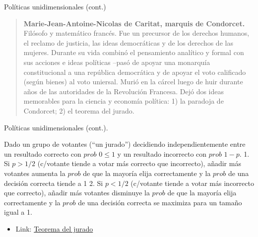 \documentclass[
  ignorenonframetext,
]{beamer}
\providecommand{\tightlist}{%
  \setlength{\itemsep}{0pt}\setlength{\parskip}{0pt}}\usepackage{longtable,booktabs,array}
\begin{document}
\begin{frame}
\begin{block}{Políticas unidimensionales (cont.)}
\protect\hypertarget{poluxedticas-unidimensionales-cont.}{}
\begin{quote}
\textbf{Marie-Jean-Antoine-Nicolas de Caritat, marquis de Condorcet.}
Filósofo y matemático francés. Fue un precursor de los derechos humanos,
el reclamo de justicia, las ideas democráticas y de los derechos de las
mujeres. Durante su vida combinó el pensamiento analítico y formal con
sus acciones e ideas políticas --pasó de apoyar una monarquía
constitucional a una república democrática y de apoyar el voto
calificado (según bienes) al voto uniersal. Murió en la cárcel luego de
huir durante años de las autoridades de la Revolución Francesa. Dejó dos
ideas memorables para la ciencia y economía política: 1) la paradoja de
Condorcet; 2) el teorema del jurado.
\end{quote}
\end{block}

\begin{block}{Políticas unidimensionales (cont.).}
\protect\hypertarget{poluxedticas-unidimensionales-cont..}{}
\begin{tcolorbox}[enhanced jigsaw, titlerule=0mm, breakable, colback=white, left=2mm, coltitle=black, toptitle=1mm, leftrule=.75mm, opacityback=0, bottomtitle=1mm, opacitybacktitle=0.6, colbacktitle=quarto-callout-important-color!10!white, title={El teorema del jurado}, toprule=.15mm, colframe=quarto-callout-important-color-frame, rightrule=.15mm, arc=.35mm, bottomrule=.15mm]

Dado un grupo de votantes (``un jurado'') decidiendo independientemente
entre un resultado correcto con \emph{\(prob\)} \(0 \leq 1\) y un
resultado incorrecto con \emph{\(prob\)} \(1-p\). 1. Si \(p > 1/2\)
(c/votante tiende a votar más correcto que incorrecto), añadir más
votantes aumenta la \emph{\(prob\)} de que la mayoría elija
correctamente y la \emph{\(prob\)} de una decisión correcta tiende a 1
2. Si \(p < 1/2\) (c/votante tiende a votar más incorrecto que
correcto), añadir más votantes disminuye la \emph{\(prob\)} de que la
mayoría elija correctamente y la \emph{\(prob\)} de una decisión
correcta se maximiza para un tamaño igual a 1.

\end{tcolorbox}

\begin{itemize}
\tightlist
\item
  Link: \href{https://www.geogebra.org/m/ntctceas}{Teorema del jurado}
\end{itemize}
\end{block}


\end{frame}
\end{document}
